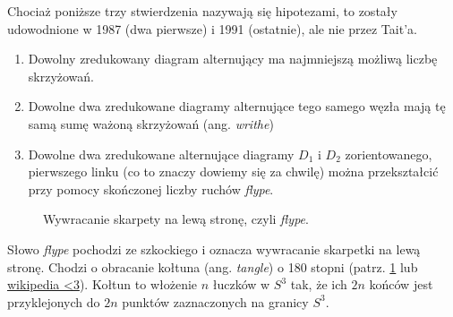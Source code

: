 \documentclass{article}
\begin{document}
\begin{thm}
  Chociaż poniższe trzy stwierdzenia nazywają się hipotezami, to zostały udowodnione w 1987 (dwa pierwsze) i 1991 (ostatnie), ale nie przez Tait'a.
  \begin{enumerate}
    \item Dowolny zredukowany diagram alternujący ma najmniejszą możliwą liczbę skrzyżowań.
    \item Dowolne dwa zredukowane diagramy alternujące tego samego węzła mają tę samą sumę ważoną skrzyżowań (ang. \emph{writhe})
    \item Dowolne dwa zredukowane alternujące diagramy $D_1$ i $D_2$ zorientowanego, pierwszego linku (co to znaczy dowiemy się za chwilę) można przekształcić przy pomocy skończonej liczby ruchów \emph{flype}.
  \end{enumerate}
\end{thm}

\begin{figure}[h]\centering
  \caption{\label{flype}Wywracanie skarpety na lewą stronę, czyli \emph{flype}.}
\end{figure}

Słowo \emph{flype} pochodzi ze szkockiego i oznacza wywracanie skarpetki na lewą stronę. Chodzi o obracanie kołtuna (ang. \emph{tangle}) o 180 stopni (patrz. \cref{flype} lub \href{https://en.wikipedia.org/wiki/Flype}{wikipedia <3}). Kołtun to włożenie $n$ łuczków w $S^3$ tak, że ich $2n$ końców jest przyklejonych do $2n$ punktów zaznaczonych na granicy $S^3$.
\end{document}
